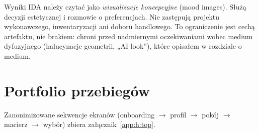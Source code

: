Wyniki IDA należy czytać jako \emph{wizualizacje koncepcyjne} (mood images). Służą decyzji estetycznej i rozmowie o preferencjach. Nie zastępują projektu wykonawczego, inwentaryzacji ani doboru handlowego. To ograniczenie jest cechą artefaktu, nie brakiem: chroni przed nadmiernymi oczekiwaniami wobec medium dyfuzyjnego (halucynacje geometrii, „AI look”), które opisałem w rozdziale o medium.

\section{Portfolio przebiegów}
\label{ch07:sec:portfolio}

Zanonimizowane sekwencje ekranów (onboarding $\rightarrow$ profil $\rightarrow$ pokój $\rightarrow$ macierz $\rightarrow$ wybór) zbiera załącznik~\ref{app:h:top}.
